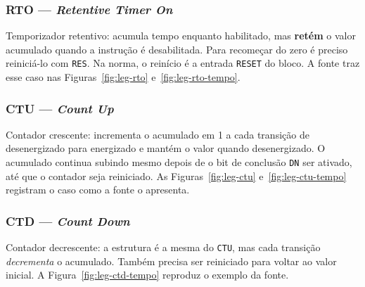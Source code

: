 \subsubsection{RTO --- \emph{Retentive Timer On}}

Temporizador retentivo: acumula tempo enquanto habilitado, mas \textbf{retém} o valor acumulado quando
a instrução é desabilitada. Para recomeçar do zero é preciso reiniciá-lo com \texttt{RES}. Na norma, o
reinício é a entrada \texttt{RESET} do bloco.
A fonte traz esse caso nas Figuras~\ref{fig:leg-rto} e~\ref{fig:leg-rto-tempo}.



\subsubsection{CTU --- \emph{Count Up}}

Contador crescente: incrementa o acumulado em 1 a cada transição de desenergizado para energizado e
mantém o valor quando desenergizado. O acumulado continua subindo mesmo depois de o bit de conclusão
\texttt{DN} ser ativado, até que o contador seja reiniciado.
As Figuras~\ref{fig:leg-ctu} e~\ref{fig:leg-ctu-tempo} registram o caso como a fonte o apresenta.



\subsubsection{CTD --- \emph{Count Down}}

Contador decrescente: a estrutura é a mesma do \texttt{CTU}, mas cada transição \emph{decrementa} o
acumulado. Também precisa ser reiniciado para voltar ao valor inicial.
A Figura~\ref{fig:leg-ctd-tempo} reproduz o exemplo da fonte.

